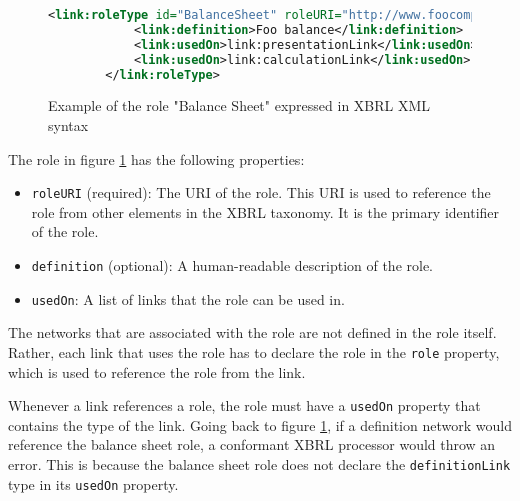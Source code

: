 \begin{figure}[H]
    \caption{Example of the role "Balance Sheet" expressed in XBRL XML syntax}
    \label{fig:example_role_xbrl}
    \begin{lstlisting}[language=XML,basicstyle=\fontsize{7}{10}\selectfont\ttfamily]
        <link:roleType id="BalanceSheet" roleURI="http://www.foocompany.com/role/BalanceSheet">
            <link:definition>Foo balance</link:definition>
            <link:usedOn>link:presentationLink</link:usedOn>
            <link:usedOn>link:calculationLink</link:usedOn>
        </link:roleType>
    \end{lstlisting}
\end{figure}

The role in figure \ref{fig:example_role_xbrl} has the following properties:

\begin{itemize}
    \item \texttt{roleURI} (required): The URI of the role. This URI is used to reference the role from other elements in the XBRL taxonomy. It is the primary identifier of the role.
    \item \texttt{definition} (optional): A human-readable description of the role.
    \item \texttt{usedOn}: A list of links that the role can be used in.
\end{itemize}

The networks that are associated with the role are not defined in the role itself.
Rather, each link that uses the role has to declare the role in the \texttt{role} property,
which is used to reference the role from the link.

Whenever a link references a role, the role must have a \texttt{usedOn} property that contains the type of the link.
Going back to figure \ref{fig:example_role_xbrl}, if a definition network would reference the balance sheet role, 
a conformant XBRL processor would throw an error.
This is because the balance sheet role does not declare the \texttt{definitionLink} type in its \texttt{usedOn} property.